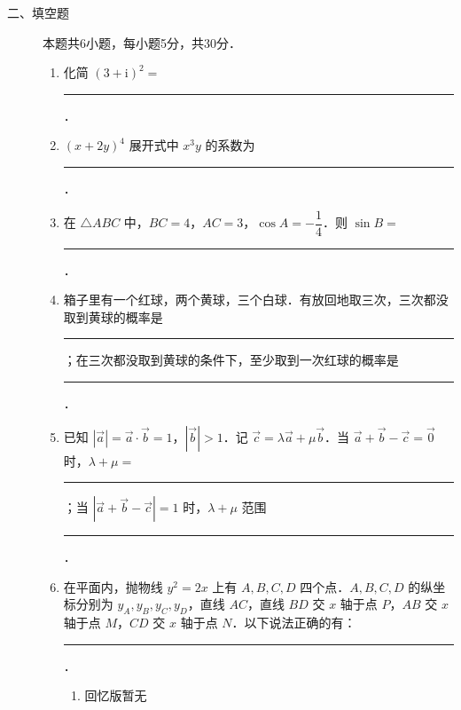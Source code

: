 \begin{description}
    \item[二、填空题] 本题共6小题，每小题5分，共30分．
    \begin{enumerate}[leftmargin=5pt]
      \addtocounter{enumi}{+9}
        \item 化简 $(3+\mathrm{i})^2=$ \rule[-0.3ex]{3em}{0.4pt}．
        \item $(x+2y)^4$ 展开式中 $x^3y$ 的系数为 \rule[-0.3ex]{3em}{0.4pt}．
        \item 在 $\triangle ABC$ 中，$BC=4$，$AC=3$，$\cos A=-\dfrac{1}{4}$．则 $\sin B=$ \rule[-0.3ex]{3em}{0.4pt}．
        \item 箱子里有一个红球，两个黄球，三个白球．有放回地取三次，三次都没取到黄球的概率是 \rule[-0.3ex]{3em}{0.4pt}；在三次都没取到黄球的条件下，至少取到一次红球的概率是 \rule[-0.3ex]{3em}{0.4pt}．
        \item 已知 $|\vec{a}|=\vec{a}\cdot\vec{b}=1$，$|\vec{b}|>1$．记 $\vec{c}=\lambda\vec{a}+\mu\vec{b}$．当 $\vec{a}+\vec{b}-\vec{c}=\vec{0}$ 时，$\lambda+\mu=$ \rule[-0.3ex]{3em}{0.4pt}；当 $|\vec{a}+\vec{b}-\vec{c}|=1$ 时，$\lambda+\mu$ 范围 \rule[-0.3ex]{3em}{0.4pt}．
        \item 在平面内，抛物线 $y^2=2x$ 上有 $A,B,C,D$ 四个点．$A,B,C,D$ 的纵坐标分别为 $y_A,y_B,y_C,y_D$，直线 $AC$，直线 $BD$ 交 $x$ 轴于点 $P$，$AB$ 交 $x$ 轴于点 $M$，$CD$ 交 $x$ 轴于点 $N$．以下说法正确的有： \rule[-0.3ex]{3em}{0.4pt}．
        \begin{enumerate}[label=\textcircled{\arabic*}]
            \item 回忆版暂无
        \end{enumerate}
    \end{enumerate}
\end{description}

